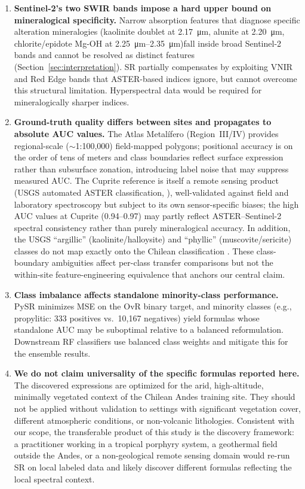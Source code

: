 \documentclass[preprint,authoryear,number]{elsarticle}
\begin{document}
\begin{enumerate}
  \item \textbf{Sentinel-2's two SWIR bands impose a hard upper bound on mineralogical specificity.} Narrow absorption features that diagnose specific alteration mineralogies (kaolinite doublet at \SI{2.17}{\micro\meter}, alunite at \SI{2.20}{\micro\meter}, chlorite/epidote Mg-OH at \SI{2.25}{\micro\meter}--\SI{2.35}{\micro\meter})fall inside broad Sentinel-2 bands and cannot be resolved as distinct features (Section~\ref{sec:interpretation}). SR partially compensates by exploiting VNIR and Red Edge bands that ASTER-based indices ignore, but cannot overcome this structural limitation. Hyperspectral data would be required for mineralogically sharper indices.
  \item \textbf{Ground-truth quality differs between sites and propagates to absolute AUC values.} The Atlas Metal\'ifero (Region~III/IV) provides regional-scale ($\sim$1:100{,}000) field-mapped polygons; positional accuracy is on the order of tens of meters and class boundaries reflect surface expression rather than subsurface zonation, introducing label noise that may suppress measured AUC. The Cuprite reference is itself a remote sensing product (USGS automated ASTER classification, \citealp{Rockwell2017}), well-validated against field and laboratory spectroscopy \citep{Swayze2014} but subject to its own sensor-specific biases; the high AUC values at Cuprite (0.94--0.97) may partly reflect ASTER--Sentinel-2 spectral consistency rather than purely mineralogical accuracy. In addition, the USGS ``argillic'' (kaolinite/halloysite) and ``phyllic'' (muscovite/sericite) classes do not map exactly onto the Chilean classification \citep{Sillitoe2010}. These class-boundary ambiguities affect per-class transfer comparisons but not the within-site feature-engineering equivalence that anchors our central claim.
  \item \textbf{Class imbalance affects standalone minority-class performance.} PySR minimizes MSE on the OvR binary target, and minority classes (e.g., propylitic: 333 positives vs.\ 10{,}167 negatives) yield formulas whose standalone AUC may be suboptimal relative to a balanced reformulation. Downstream RF classifiers use balanced class weights and mitigate this for the ensemble results.
  \item \textbf{We do not claim universality of the specific formulas reported here.} The discovered expressions are optimized for the arid, high-altitude, minimally vegetated context of the Chilean Andes training site. They should not be applied without validation to settings with significant vegetation cover, different atmospheric conditions, or non-volcanic lithologies. Consistent with our scope, the transferable product of this study is the discovery framework: a practitioner working in a tropical porphyry system, a geothermal field outside the Andes, or a non-geological remote sensing domain would re-run SR on local labeled data and likely discover different formulas reflecting the local spectral context.

\end{enumerate}
\end{document}
